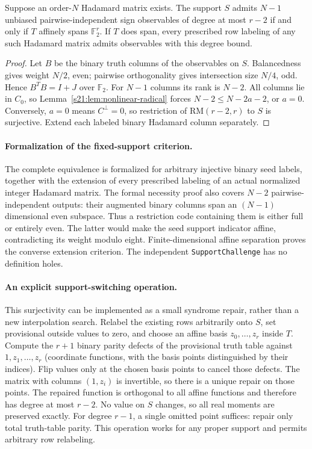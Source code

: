 \begin{theorem}
\label{s21:thm:nonlinear-fixed-support}
Suppose an order-$N$ Hadamard matrix exists. The support $S$ admits
$N-1$ unbiased pairwise-independent sign observables of degree at most
$r-2$ if and only if $T$ affinely spans $\mathbb F_2^r$.
If $T$ does span, every prescribed row labeling of any such Hadamard
matrix admits observables with this degree bound.
\end{theorem}
\begin{proof}
Let $B$ be the binary truth columns of the observables on $S$.
Balancedness gives weight $N/2$, even; pairwise orthogonality gives
intersection size $N/4$, odd. Hence $B^TB=I+J$ over $\mathbb F_2$.
For $N-1$ columns its rank is $N-2$. All columns lie in $C_0$, so
Lemma~\ref{s21:lem:nonlinear-radical} forces
$N-2\le N-2a-2$, or $a=0$.
Conversely, $a=0$ means $C^\perp=0$, so restriction of
$\mathrm{RM}(r-2,r)$ to $S$ is surjective. Extend each labeled binary
Hadamard column separately.
\end{proof}

\paragraph{Formalization of the fixed-support criterion.}
The complete equivalence is formalized for arbitrary injective binary
seed labels, together with the extension of every prescribed labeling
of an actual normalized integer Hadamard matrix. The formal necessity
proof also covers $N-2$ pairwise-independent outputs: their augmented
binary columns span an $(N-1)$ dimensional even subspace. Thus a
restriction code containing them is either full or entirely even.
The latter would make the seed support indicator affine, contradicting
its weight modulo eight. Finite-dimensional affine separation proves
the converse extension criterion. The independent
\texttt{SupportChallenge} has no definition holes.

\paragraph{An explicit support-switching operation.}
This surjectivity can be implemented as a small syndrome repair, rather
than a new interpolation search. Relabel the existing rows arbitrarily
onto $S$, set provisional outside values to zero, and choose an affine
basis $z_0,\ldots,z_r$ inside $T$. Compute the $r+1$ binary parity defects
of the provisional truth table against $1,z_1,\ldots,z_r$ (coordinate
functions, with the basis points distinguished by their indices).
Flip values only at the chosen basis points to cancel those defects.
The matrix with columns $(1,z_i)$ is invertible, so there is a unique
repair on those points. The repaired function is orthogonal to all
affine functions and therefore has degree at most $r-2$.
No value on $S$ changes, so all real moments are preserved exactly.
For degree $r-1$, a single omitted point suffices: repair only total
truth-table parity. This operation works for any proper support and
permits arbitrary row relabeling.

